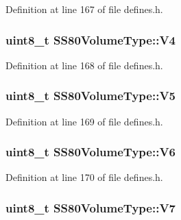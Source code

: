Definition at line 167 of file defines.\+h.

\subsubsection[{\texorpdfstring{V4}{V4}}]{\setlength{\rightskip}{0pt plus 5cm}uint8\+\_\+t S\+S80\+Volume\+Type\+::\+V4}\hypertarget{structSS80VolumeType_af9d8bebf55fc497315218fe31308fb67}{}\label{structSS80VolumeType_af9d8bebf55fc497315218fe31308fb67}


Definition at line 168 of file defines.\+h.

\subsubsection[{\texorpdfstring{V5}{V5}}]{\setlength{\rightskip}{0pt plus 5cm}uint8\+\_\+t S\+S80\+Volume\+Type\+::\+V5}\hypertarget{structSS80VolumeType_a0dd8407a160f58905f93cedcf89c92a4}{}\label{structSS80VolumeType_a0dd8407a160f58905f93cedcf89c92a4}


Definition at line 169 of file defines.\+h.

\subsubsection[{\texorpdfstring{V6}{V6}}]{\setlength{\rightskip}{0pt plus 5cm}uint8\+\_\+t S\+S80\+Volume\+Type\+::\+V6}\hypertarget{structSS80VolumeType_ae75294f5cb3a30f1364b44ec67ae0efd}{}\label{structSS80VolumeType_ae75294f5cb3a30f1364b44ec67ae0efd}


Definition at line 170 of file defines.\+h.

\subsubsection[{\texorpdfstring{V7}{V7}}]{\setlength{\rightskip}{0pt plus 5cm}uint8\+\_\+t S\+S80\+Volume\+Type\+::\+V7}\hypertarget{structSS80VolumeType_ab3b5337987dc6c7806fc290a819c5c8c}{}\label{structSS80VolumeType_ab3b5337987dc6c7806fc290a819c5c8c}


